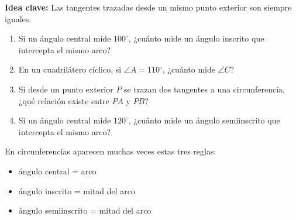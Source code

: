 \documentclass[12pt]{article}
\begin{document}
    \begin{center}
    \end{center}

    \begin{idea}
        \textbf{Idea clave:} Las tangentes trazadas desde un mismo punto exterior son siempre iguales.
    \end{idea}

    \begin{desafio}
        \begin{enumerate}
            \item Si un ángulo central mide $100^\circ$, ¿cuánto mide un ángulo inscrito que intercepta el mismo arco?

            \item En un cuadrilátero cíclico, si $\angle A = 110^\circ$, ¿cuánto mide $\angle C$?

            \item Si desde un punto exterior $P$ se trazan dos tangentes a una circunferencia, ¿qué relación existe entre $PA$ y $PB$?

            \item Si un ángulo central mide $120^\circ$, ¿cuánto mide un ángulo semiinscrito que intercepta el mismo arco?
        \end{enumerate}
    \end{desafio}

    \begin{idea}
        En circunferencias aparecen muchas veces estas tres reglas:
        \begin{itemize}
            \item ángulo central = arco
            \item ángulo inscrito = mitad del arco
            \item ángulo semiinscrito = mitad del arco
        \end{itemize}
    \end{idea}
\end{document}
